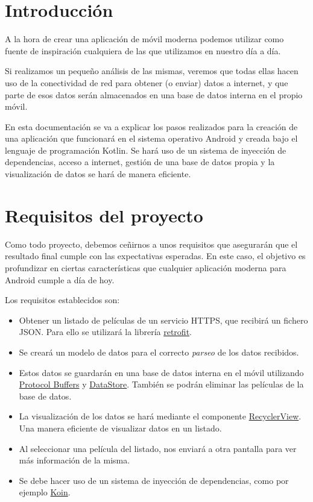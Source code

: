 \documentclass{\ClassPath/viu-tfm-template}
\begin{document}
    \graphicspath{{../../VIU_TFM_LaTeX_template/}}

    \coverpage

    \tableofcontents

\chapter{Introducción}

A la hora de crear una aplicación de móvil moderna podemos utilizar como fuente de inspiración cualquiera de las que utilizamos en nuestro día a día.

Si realizamos un pequeño análisis de las mismas, veremos que todas ellas hacen uso de la conectividad de red para obtener (o enviar) datos a internet, y que parte de esos datos serán almacenados en una base de datos interna en el propio móvil.

En esta documentación se va a explicar los pasos realizados para la creación de una aplicación que funcionará en el sistema operativo Android y creada bajo el lenguaje de programación Kotlin. Se hará uso de un sistema de inyección de dependencias, acceso a internet, gestión de una base de datos propia y la visualización de datos se hará de manera eficiente.


\chapter{Requisitos del proyecto}

Como todo proyecto, debemos ceñirnos a unos requisitos que asegurarán que el resultado final cumple con las expectativas esperadas. En este caso, el objetivo es profundizar en ciertas características que cualquier aplicación moderna para Android cumple a día de hoy.

Los requisitos establecidos son:

\begin{itemize}
    \item Obtener un listado de películas de un servicio HTTPS, que recibirá un fichero JSON. Para ello se utilizará la librería \href{https://github.com/square/retrofit}{retrofit}.
    \item Se creará un modelo de datos para el correcto \textit{parseo} de los datos recibidos.
    \item Estos datos se guardarán en una base de datos interna en el móvil utilizando \href{https://developers.google.com/protocol-buffers}{Protocol Buffers} y \href{https://developer.android.com/topic/libraries/architecture/datastore}{DataStore}. También se podrán eliminar las películas de la base de datos.
    \item La visualización de los datos se hará mediante el componente \href{https://developer.android.com/develop/ui/views/layout/recyclerview}{RecyclerView}. Una manera eficiente de visualizar datos en un listado.
    \item Al seleccionar una película del listado, nos enviará a otra pantalla para ver más información de la misma.
    \item Se debe hacer uso de un sistema de inyección de dependencias, como por ejemplo \href{https://insert-koin.io/}{Koin}.
\end{itemize}
\end{document}
